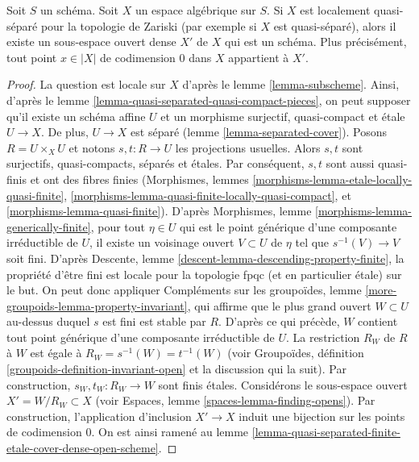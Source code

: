 \begin{proposition}
\label{proposition-locally-quasi-separated-open-dense-scheme}
Soit $S$ un schéma. Soit $X$ un espace algébrique sur $S$. Si $X$ est
localement quasi-séparé pour la topologie de Zariski (par exemple si $X$ est quasi-séparé), alors
il existe un sous-espace ouvert dense $X'$ de $X$ qui est un schéma.
Plus précisément, tout point $x \in |X|$ de codimension $0$ dans $X$
appartient à $X'$.
\end{proposition}

\begin{proof}
La question est locale sur $X$ d'après le lemme \ref{lemma-subscheme}.
Ainsi, d'après le lemme \ref{lemma-quasi-separated-quasi-compact-pieces},
on peut supposer qu'il existe un schéma affine $U$ et un morphisme
surjectif, quasi-compact et \'etale $U \to X$.
De plus, $U \to X$ est séparé (lemme \ref{lemma-separated-cover}).
Posons $R = U \times_X U$ et notons $s, t : R \to U$ les projections
usuelles. Alors $s, t$ sont surjectifs, quasi-compacts, séparés et
\'etales. Par conséquent, $s, t$ sont aussi quasi-finis et ont des fibres finies
(Morphismes,
lemmes \ref{morphisms-lemma-etale-locally-quasi-finite},
\ref{morphisms-lemma-quasi-finite-locally-quasi-compact}, et
\ref{morphisms-lemma-quasi-finite}).
D'après Morphismes, lemme \ref{morphisms-lemma-generically-finite},
pour tout $\eta \in U$ qui est le point générique d'une
composante irréductible de $U$, il existe un voisinage ouvert
$V \subset U$ de $\eta$ tel que $s^{-1}(V) \to V$ soit fini. D'après
Descente, lemme \ref{descent-lemma-descending-property-finite},
la propriété d'être fini est locale pour la topologie fpqc (et en particulier \'etale) sur le but.
On peut donc appliquer
Compléments sur les groupoïdes, lemme \ref{more-groupoids-lemma-property-invariant},
qui affirme que le plus grand ouvert $W \subset U$ au-dessus duquel $s$ est
fini est stable par $R$. D'après ce qui précède, $W$ contient tout
point générique d'une composante irréductible de $U$.
La restriction $R_W$ de $R$ à $W$ est égale à $R_W = s^{-1}(W) = t^{-1}(W)$
(voir Groupoïdes, définition \ref{groupoids-definition-invariant-open}
et la discussion qui la suit).
Par construction, $s_W, t_W : R_W \to W$ sont finis \'etales.
Considérons le sous-espace ouvert $X' = W/R_W \subset X$ (voir
Espaces, lemme \ref{spaces-lemma-finding-opens}).
Par construction, l'application d'inclusion $X' \to X$
induit une bijection sur les points de codimension $0$.
On est ainsi ramené au
lemme \ref{lemma-quasi-separated-finite-etale-cover-dense-open-scheme}.
\end{proof}




